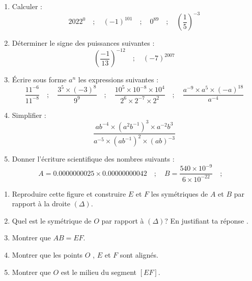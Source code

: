 \documentclass[a4paper,12pt]{article}
\begin{document}
\devoir[ds=false,num=2 ,niv=2 , date=01/12/2022,Rdate=12/12/2022 ]

\begin{exo}
\begin{enumerate}
\item Calculer : 
\[ 2022^{0} \quad; \quad (-1)^{101} \quad; \quad 0^{89} \quad; \quad (\dfrac{1}{5})^{-3}\]
\item Déterminer le signe des puissances suivantes :
\[ (\dfrac{-1}{13})^{-12} \quad; \quad 
	(-7)^{2007}
\] 
\item Écrire sous forme $a^{n}$ les expressions suivantes :
\[\dfrac{11^{-6}}{11^{-8}}\quad; \quad
	\dfrac{3^{5}\times (-3)^{8}}{9^{9}}\quad; \quad
	\dfrac{10^{5}\times 10^{-8}\times 10^{4}}{2^{6}\times 2^{-7}\times 2^{2}}\quad; \quad
\dfrac{a^{-9}\times a^{5}\times (-a)^{18}}{a^{-4}}
\]
\item Simplifier : 
\[
\dfrac{ab^{-4}\times (a^{2}b^{-1})^{3}\times a^{-2}b^{3}}{a^{-5}\times (ab^{-1})^{2}\times (ab)^{-3}}
\]
\item Donner l'écriture scientifique des nombres suivants :
\[
	A=0.0000000025\times 0.00000000042 \quad; \quad
	B=\dfrac{540\times 10^{-9}}{6\times 10^{-22}}\quad; \quad
\]
\end{enumerate}
\end{exo}

\begin{exo}
\begin{minipage}{.6\textwidth}
\begin{enumerate}
\item Reproduire cette figure et construire $E$ et $F$ les symétriques de $A$ et $B$ par rapport à la droite  $(\Delta)$.
\item Quel est le symétrique de $O$ par rapport à $(\Delta)$? En justifiant ta réponse .
\item Montrer que $AB=EF$.
\item Montrer que les points $O$ , $E$ et $F$ sont alignés.
\item Montrer que $O$ est le milieu du segment $[EF]$.
\end{enumerate}
\end{minipage}
\begin{minipage}{.4\textwidth}
\end{minipage}
\end{exo}
\end{document}
